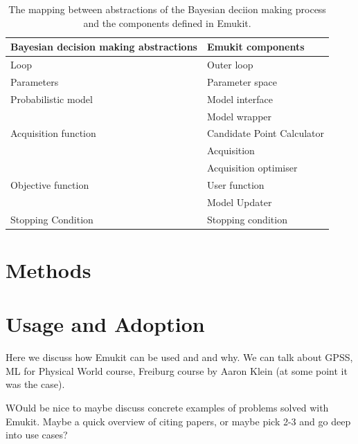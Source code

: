 \begin{table}
    \setlength{\DUtablewidth}{\tablewidth}
    \begin{longtable}[c]{p{0.4\DUtablewidth}p{0.4\DUtablewidth}}
        \toprule
        \textbf{Bayesian decision making abstractions} & \textbf{Emukit components} \\
        \midrule
        \endfirsthead
        Loop & Outer loop \\
        \midrule
        Parameters & Parameter space \\
        Probabilistic model & Model interface \\
        & Model wrapper \\
        \midrule
        Acquisition function & Candidate Point Calculator \\
        & Acquisition \\
        & Acquisition optimiser \\
        \midrule
        Objective function & User function \\
        & Model Updater \\
        \midrule
        Stopping Condition & Stopping condition \\
        \bottomrule
    \end{longtable}
    \caption{The mapping between abstractions of the Bayesian deciion making process and the components defined in Emukit.}
    \label{table:abstraction_mapping}
\end{table}

\section{Methods}


\section{Usage and Adoption}
Here we discuss how Emukit can be used and and why. We can talk about GPSS, ML for Physical World course, Freiburg course by Aaron Klein (at some point it was the case). 

WOuld be nice to maybe discuss concrete examples of problems solved with Emukit. Maybe a quick overview of citing papers, or maybe pick 2-3 and go deep into use cases? 

